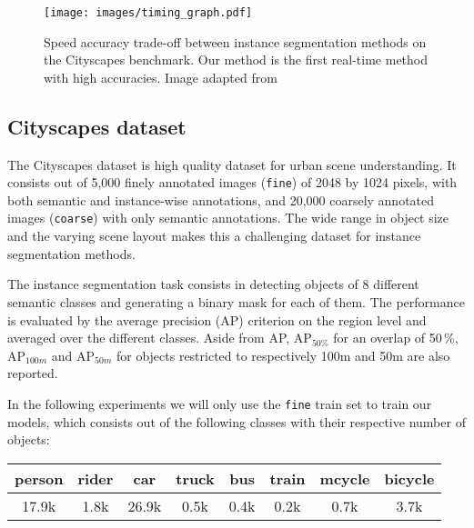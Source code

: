 \begin{figure}
    \begin{center}
    	\texttt{[image: images/timing\_graph.pdf]}
    \end{center}
    \caption{Speed accuracy trade-off between instance segmentation methods on the Cityscapes benchmark. Our method is the first real-time method with high accuracies. Image adapted from ~\cite{uhrig2018box2pix}}
    \label{fig:timing_results}
\end{figure}

\subsection{Cityscapes dataset}
The Cityscapes dataset is high quality dataset for urban scene understanding. It consists out of 5,000 finely annotated images (\texttt{fine}) of 2048 by 1024 pixels, with both semantic and instance-wise annotations, and 20,000 coarsely annotated images (\texttt{coarse}) with only semantic annotations. The wide range in object size and the varying scene layout makes this a challenging dataset for instance segmentation methods. 

The instance segmentation task consists in detecting objects of 8 different semantic classes and generating a binary mask for each of them. The performance is evaluated by the average precision (AP) criterion on the region level and averaged over the different classes. Aside from AP, $\text{AP}_{50\%}$ for an overlap of 50\,\%, $\text{AP}_{100m}$ and $\text{AP}_{50m}$ for objects restricted to respectively 100m and 50m are also reported. 

In the following experiments we will only use the \texttt{fine} train set to train our models, which consists out of the following classes with their respective number of objects:

\vspace{3mm}

\begin{centering}
    \footnotesize
    \centering
    \begin{tabular}{c|c|c|c|c|c|c|c}
         person & rider & car & truck & bus & train & mcycle & bicycle \\
         \hline 
         17.9k & 1.8k & 26.9k & 0.5k & 0.4k & 0.2k & 0.7k & 3.7k \\
    \end{tabular}
\end{centering}


